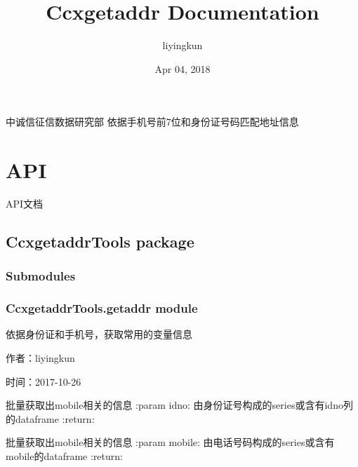\documentclass[letterpaper,10pt,english]{sphinxmanual}
\title{Ccxgetaddr Documentation}
\date{Apr 04, 2018}
\author{liyingkun}
\begin{document}
\maketitle
\sphinxtableofcontents
{}\label{\detokenize{index::doc}}


中诚信征信数据研究部 依据手机号前7位和身份证号码匹配地址信息


\chapter{API}
\label{\detokenize{index:welcome-to-ccxgetaddr-s-documentation}}\label{\detokenize{index:api}}
API文档


\section{CcxgetaddrTools package}
\label{\detokenize{CcxgetaddrTools::doc}}\label{\detokenize{CcxgetaddrTools:ccxgetaddrtools-package}}

\subsection{Submodules}
\label{\detokenize{CcxgetaddrTools:submodules}}

\subsection{CcxgetaddrTools.getaddr module}
\label{\detokenize{CcxgetaddrTools:ccxgetaddrtools-getaddr-module}}\label{\detokenize{CcxgetaddrTools:module-CcxgetaddrTools.getaddr}}
依据身份证和手机号，获取常用的变量信息

作者：liyingkun

时间：2017-10-26

\begin{fulllineitems}
\label{\detokenize{CcxgetaddrTools:CcxgetaddrTools.getaddr.f_Get_idno_Info}}
批量获取出mobile相关的信息
:param idno: 由身份证号构成的series或含有idno列的dataframe
:return:

\end{fulllineitems}


\begin{fulllineitems}
\label{\detokenize{CcxgetaddrTools:CcxgetaddrTools.getaddr.f_Get_mobile_Info}}
批量获取出mobile相关的信息
:param mobile: 由电话号码构成的series或含有mobile的dataframe
:return:

\end{fulllineitems}
\end{document}
